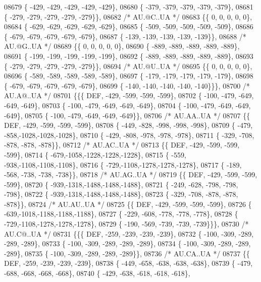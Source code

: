 \begin{DoxyCode}
08679 \{ -429, -429, -429, -429, -429\},
08680 \{ -379, -379, -379, -379, -379\},
08681 \{ -279, -279, -279, -279, -279\}\},
08682 \textcolor{comment}{/* AU.@C..UA */}
08683 \{\{    0,    0,    0,    0,    0\},
08684 \{ -629, -629, -629, -629, -629\},
08685 \{ -509, -509, -509, -509, -509\},
08686 \{ -679, -679, -679, -679, -679\},
08687 \{ -139, -139, -139, -139, -139\}\},
08688 \textcolor{comment}{/* AU.@G..UA */}
08689 \{\{    0,    0,    0,    0,    0\},
08690 \{ -889, -889, -889, -889, -889\},
08691 \{ -199, -199, -199, -199, -199\},
08692 \{ -889, -889, -889, -889, -889\},
08693 \{ -279, -279, -279, -279, -279\}\},
08694 \textcolor{comment}{/* AU.@U..UA */}
08695 \{\{    0,    0,    0,    0,    0\},
08696 \{ -589, -589, -589, -589, -589\},
08697 \{ -179, -179, -179, -179, -179\},
08698 \{ -679, -679, -679, -679, -679\},
08699 \{ -140, -140, -140, -140, -140\}\}\},
08700 \textcolor{comment}{/* AU.A@..UA */}
08701 \{\{\{  DEF, -429, -599, -599, -599\},
08702 \{ -100, -479, -649, -649, -649\},
08703 \{ -100, -479, -649, -649, -649\},
08704 \{ -100, -479, -649, -649, -649\},
08705 \{ -100, -479, -649, -649, -649\}\},
08706 \textcolor{comment}{/* AU.AA..UA */}
08707 \{\{  DEF, -429, -599, -599, -599\},
08708 \{ -449, -828, -998, -998, -998\},
08709 \{ -479, -858,-1028,-1028,-1028\},
08710 \{ -429, -808, -978, -978, -978\},
08711 \{ -329, -708, -878, -878, -878\}\},
08712 \textcolor{comment}{/* AU.AC..UA */}
08713 \{\{  DEF, -429, -599, -599, -599\},
08714 \{ -679,-1058,-1228,-1228,-1228\},
08715 \{ -559, -938,-1108,-1108,-1108\},
08716 \{ -729,-1108,-1278,-1278,-1278\},
08717 \{ -189, -568, -738, -738, -738\}\},
08718 \textcolor{comment}{/* AU.AG..UA */}
08719 \{\{  DEF, -429, -599, -599, -599\},
08720 \{ -939,-1318,-1488,-1488,-1488\},
08721 \{ -249, -628, -798, -798, -798\},
08722 \{ -939,-1318,-1488,-1488,-1488\},
08723 \{ -329, -708, -878, -878, -878\}\},
08724 \textcolor{comment}{/* AU.AU..UA */}
08725 \{\{  DEF, -429, -599, -599, -599\},
08726 \{ -639,-1018,-1188,-1188,-1188\},
08727 \{ -229, -608, -778, -778, -778\},
08728 \{ -729,-1108,-1278,-1278,-1278\},
08729 \{ -190, -569, -739, -739, -739\}\}\},
08730 \textcolor{comment}{/* AU.C@..UA */}
08731 \{\{\{  DEF, -259, -239, -239, -239\},
08732 \{ -100, -309, -289, -289, -289\},
08733 \{ -100, -309, -289, -289, -289\},
08734 \{ -100, -309, -289, -289, -289\},
08735 \{ -100, -309, -289, -289, -289\}\},
08736 \textcolor{comment}{/* AU.CA..UA */}
08737 \{\{  DEF, -259, -239, -239, -239\},
08738 \{ -449, -658, -638, -638, -638\},
08739 \{ -479, -688, -668, -668, -668\},
08740 \{ -429, -638, -618, -618, -618\},

\end{DoxyCode}
